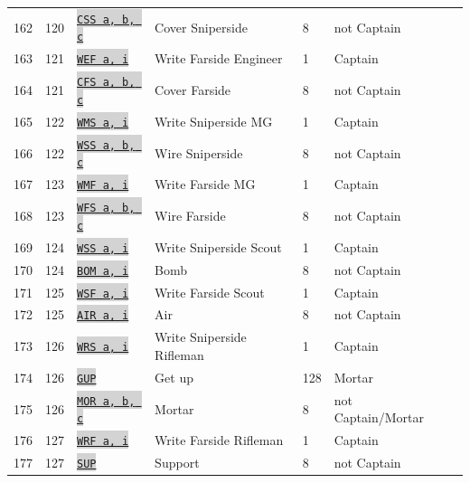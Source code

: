 \documentclass{article}
\newcommand{\vnscode}[1]{\colorbox{lightgray}{\lstinline[language=vns]{#1}}}
\begin{document}
\begin{longtable}{lllllll}
    162 & 120 & \hyperref[table:request]{\vnscode{CSS a, b, c}} & Cover Sniperside & 8 & not Captain \\
    163 & 121 & \hyperref[table:communication]{\vnscode{WEF a, i}} & Write Farside Engineer & 1 & Captain \\
    164 & 121 & \hyperref[table:request]{\vnscode{CFS a, b, c}} & Cover Farside & 8 & not Captain \\
    165 & 122 & \hyperref[table:communication]{\vnscode{WMS a, i}} & Write Sniperside MG & 1 & Captain \\
    166 & 122 & \hyperref[table:request]{\vnscode{WSS a, b, c}} & Wire Sniperside & 8 & not Captain \\
    167 & 123 & \hyperref[table:communication]{\vnscode{WMF a, i}} & Write Farside MG & 1 & Captain \\
    168 & 123 & \hyperref[table:request]{\vnscode{WFS a, b, c}} & Wire Farside & 8 & not Captain \\
    169 & 124 & \hyperref[table:communication]{\vnscode{WSS a, i}} & Write Sniperside Scout & 1 & Captain \\
    170 & 124 & \hyperref[table:request]{\vnscode{BOM a, i}} & Bomb & 8 & not Captain \\
    171 & 125 & \hyperref[table:communication]{\vnscode{WSF a, i}} & Write Farside Scout & 1 & Captain \\
    172 & 125 & \hyperref[table:request]{\vnscode{AIR a, i}} & Air & 8 & not Captain \\
    173 & 126 & \hyperref[table:communication]{\vnscode{WRS a, i}} & Write Sniperside Rifleman & 1 & Captain \\
    174 & 126 & \hyperref[table:combat]{\vnscode{GUP}} & Get up & 128 & Mortar \\
    175 & 126 & \hyperref[table:request]{\vnscode{MOR a, b, c}} & Mortar & 8 & not Captain/Mortar \\
    176 & 127 & \hyperref[table:communication]{\vnscode{WRF a, i}} & Write Farside Rifleman & 1 & Captain \\
    177 & 127 & \hyperref[table:request]{\vnscode{SUP}} & Support & 8 & not Captain
\end{longtable}
\end{document}
